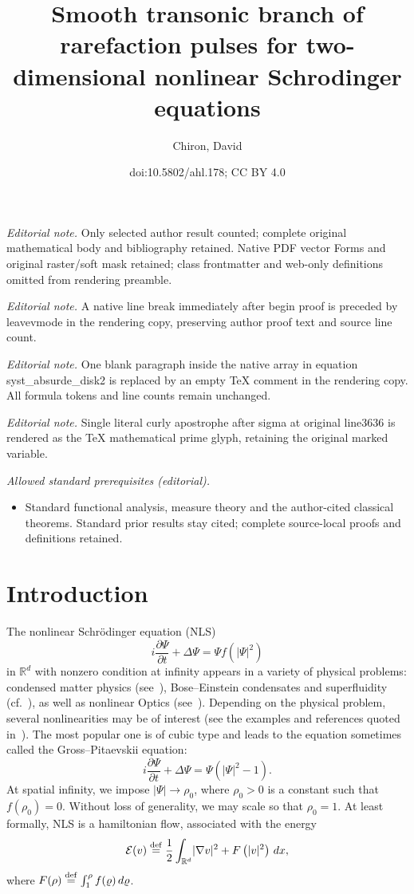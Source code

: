 \documentclass[10pt]{amsart}
\title{Smooth transonic branch of rarefaction pulses for two-dimensional nonlinear Schrodinger equations}
\author{Chiron, David}
\date{doi:10.5802/ahl.178; CC BY 4.0}
\theoremstyle{definition}\newtheorem{defi}[theo]{Definition}\newtheorem{rema}[theo]{Remark}\newtheorem{exam}[theo]{Example}\newtheorem{exem}[theo]{Example}\newtheorem{nota}[theo]{Notation}
\newcommand*\p{\partial}
\newcommand*\R{\mathbb R}
\newcommand*\ddef{\stackrel{\rm def}{=}}
\newcommand*\BE{\mathcal{E}}
\begin{document}
\maketitle
\noindent\textit{Editorial note.} Only selected author result counted; complete original mathematical body and bibliography retained. Native PDF vector Forms and original raster/soft mask retained; class frontmatter and web-only definitions omitted from rendering preamble.\par\medskip
\noindent\textit{Editorial note.} A native line break immediately after begin proof is preceded by leavevmode in the rendering copy, preserving author proof text and source line count.\par\medskip
\noindent\textit{Editorial note.} One blank paragraph inside the native array in equation syst\_absurde\_disk2 is replaced by an empty TeX comment in the rendering copy. All formula tokens and line counts remain unchanged.\par\medskip
\noindent\textit{Editorial note.} Single literal curly apostrophe after sigma at original line3636 is rendered as the TeX mathematical prime glyph, retaining the original marked variable.\par\medskip
\noindent\textit{Allowed standard prerequisites (editorial).}\begin{itemize}
\item Standard functional analysis, measure theory and the author-cited classical theorems. Standard prior results stay cited; complete source-local proofs and definitions retained.
\end{itemize}\medskip

\section{Introduction}

The nonlinear Schr\"odinger equation (NLS)
\begin{equation}
\tag{NLS} i \frac{\p \Psi}{\p t} + \Delta \Psi = \Psi f\left(|\Psi|^2\right)
\end{equation}
in $\R^d $ with nonzero condition at infinity appears in a variety of physical problems: condensed matter physics (see~\cite{Pismen}), Bose--Einstein condensates and superfluidity (cf.~\cite{AHMNPTB:03,RB}), as well as nonlinear Optics (see~\cite{KL}). Depending on the physical problem, several nonlinearities may be of interest (see the examples and references quoted in~\cite{C1d, ChiSch15}). The most popular one is of cubic type and leads to the equation sometimes called the Gross--Pitaevskii equation:
\begin{equation*}
i \frac{\p \Psi}{\p t} + \Delta \Psi = \Psi \left(|\Psi|^2 - 1\right).
\end{equation*}
At spatial infinity, we impose $ | \Psi | \to \rho_0 $, where $ \rho_0 > 0 $ is a constant such that $ f (\rho_0) = 0 $. Without loss of generality, we may scale so that $ \rho_0 =1 $. At least formally, NLS is a hamiltonian flow, associated with the energy
\[
\BE (v) \ddef \frac{1}{2} \int_{\R^d} \lvert \nabla v \rvert^2 + F\left(| v |^2\right) \, dx,
\]
where $ F(\rho) \ddef \int_1^\rho f(\varrho) \, d \varrho $.
\end{document}
